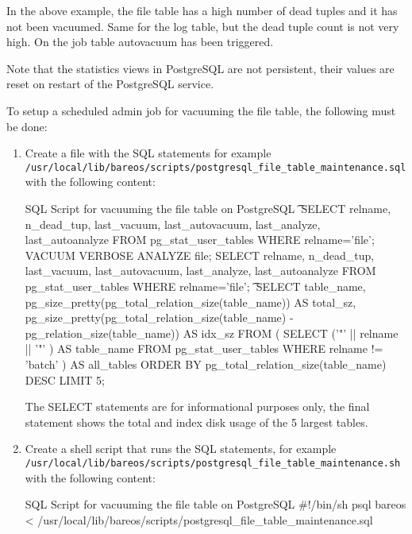 In the above example, the file table has a high number of dead tuples and it
has not been vacuumed. Same for the log table, but the dead tuple count is not
very high. On the job table autovacuum has been triggered.

Note that the statistics views in PostgreSQL are not persistent, their values
are reset on restart of the PostgreSQL service.

To setup a scheduled admin job for vacuuming the file table, the following must be done:

\begin{enumerate}
\item Create a file with the SQL statements for example\\
\texttt{/usr/local/lib/bareos/scripts/postgresql\_file\_table\_maintenance.sql}\\
with the following content:
\begin{commands}{SQL Script for vacuuming the file table on PostgreSQL}
\t \x
SELECT relname, n_dead_tup, last_vacuum, last_autovacuum, last_analyze, last_autoanalyze
FROM pg_stat_user_tables WHERE relname='file';
VACUUM VERBOSE ANALYZE file;
SELECT relname, n_dead_tup, last_vacuum, last_autovacuum, last_analyze, last_autoanalyze
FROM pg_stat_user_tables WHERE relname='file';
\t \x
SELECT table_name,
  pg_size_pretty(pg_total_relation_size(table_name)) AS total_sz,
  pg_size_pretty(pg_total_relation_size(table_name) - pg_relation_size(table_name)) AS idx_sz
  FROM ( SELECT ('"' || relname || '"' ) AS table_name
    FROM pg_stat_user_tables WHERE relname != 'batch' ) AS all_tables
  ORDER BY pg_total_relation_size(table_name) DESC LIMIT 5;
\end{commands}
The SELECT statements are for informational purposes only, the final statement
shows the total and index disk usage of the 5 largest tables.

\item Create a shell script that runs the SQL statements, for example\\
\texttt{/usr/local/lib/bareos/scripts/postgresql\_file\_table\_maintenance.sh}\\
with the following content:
\begin{commands}{SQL Script for vacuuming the file table on PostgreSQL}
#!/bin/sh
psql bareos < /usr/local/lib/bareos/scripts/postgresql_file_table_maintenance.sql
\end{commands}


\end{enumerate}
